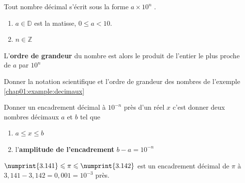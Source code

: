 \begin{theorem}\hfill 
	Tout nombre décimal s'écrit sous la forme 
	\og $a \times 10^n$ \fg{}.
	\begin{enumerate}[label=\textbullet]
		\item $a\in\mathbb{D}$ est la matisse, $0\leqslant a<10$.
		\item $n\in\mathbb{Z}$ 
	\end{enumerate}   
	L'\textbf{ordre de grandeur} du nombre est alors le produit de l'entier le plus proche de $a$ par $10^n$
\end{theorem}
\begin{example} Donner la notation scientifique et l'ordre de grandeur des nombres de l'exemple \ref{chap01:example:decimaux} 
\end{example}
\begin{definition}
	Donner un encadrement décimal à $10^{-n}$ près d'un réel $x$ c'est donner deux nombres décimaux $a$ et $b$ tel que 
	\begin{enumerate}[label=\textbullet]
		\item $a\leqslant x \leqslant b$
		\item l'\textbf{amplitude de l'encadrement} $b-a= 10^{-n}$
	\end{enumerate}   
\end{definition}
\begin{example} $\numprint{3.141}\leqslant \pi \leqslant \numprint{3.142}$ est un encadrement décimal de $\pi$ à $3,141-3,142=0,001=10^{-3}$ près.
\end{example}
 
%	 
